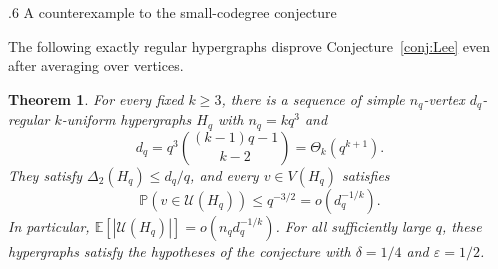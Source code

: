 \documentclass[11pt,reqno]{amsart}
\makeatletter
\numberwithin{equation}{section}
\renewcommand{\section}{\@startsection{section}{1}%
    \z@{1.3\linespacing\@plus.5\linespacing\@minus.2\linespacing}%
    {.6\linespacing}%
    {\normalfont\scshape\centering}}
\theoremstyle{plain}
\newtheorem{theorem}{Theorem}[section]
\theoremstyle{definition}
\newcommand{\E}{\mathbb E}
\newcommand{\Prob}{\mathbb P}
\newcommand{\eps}{\varepsilon}
\newcommand{\calU}{\mathcal U}
\makeatother
\begin{document}

\providecommand{\MR}[1]{}
\providecommand{\MRhref}[2]{\href{http://www.ams.org/mathscinet-getitem?mr=#1}{#2}}



\makeatletter
\@setaddresses
\global\let\addresses\@empty
\makeatother


\clearpage
\appendix


\section{A counterexample to the small-codegree conjecture}\label{sec:counterexample}

The following exactly regular hypergraphs disprove Conjecture~\ref{conj:Lee} even after averaging over vertices.

\begin{theorem}\label{thm:LeeCounterexample}
    For every fixed $k\ge3$, there is a sequence of simple $n_q$-vertex $d_q$-regular $k$-uniform hypergraphs $H_q$ with $n_q=kq^3$ and
    \[
        d_q=q^3\binom{(k-1)q-1}{k-2}=\Theta_k(q^{k+1}).
    \]
    They satisfy $\Delta_2(H_q)\le d_q/q$, and every $v\in V(H_q)$ satisfies
    \[
        \Prob(v\in\calU(H_q))\le q^{-3/2}=o(d_q^{-1/k}).
    \]
    In particular, $\E[|\calU(H_q)|]=o(n_qd_q^{-1/k})$.
    For all sufficiently large $q$, these hypergraphs satisfy the hypotheses of the conjecture with $\delta=1/4$ and $\eps=1/2$.
\end{theorem}
\end{document}

